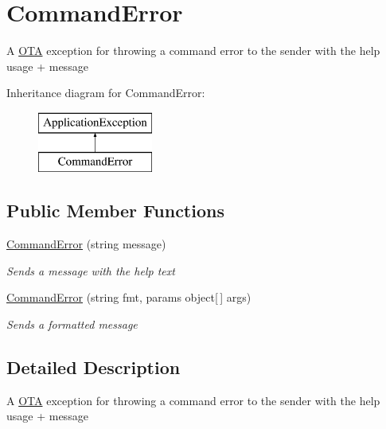 \hypertarget{classOTA_1_1Command_1_1CommandError}{}\section{Command\+Error}
\label{classOTA_1_1Command_1_1CommandError}


A \hyperlink{namespaceOTA}{O\+T\+A} exception for throwing a command error to the sender with the help usage + message  


Inheritance diagram for Command\+Error\+:\begin{figure}[H]
\begin{center}
\leavevmode
\includegraphics[height=2.000000cm]{classOTA_1_1Command_1_1CommandError}
\end{center}
\end{figure}
\subsection*{Public Member Functions}
\begin{DoxyCompactItemize}
\item 
\hyperlink{classOTA_1_1Command_1_1CommandError_a8037ed3919e1421eabe24217da22f59d}{Command\+Error} (string message)
\begin{DoxyCompactList}\small\item\em Sends a message with the help text \end{DoxyCompactList}\item 
\hyperlink{classOTA_1_1Command_1_1CommandError_a63dffa23aa9ff9c8063f8dc194d88870}{Command\+Error} (string fmt, params object\mbox{[}$\,$\mbox{]} args)
\begin{DoxyCompactList}\small\item\em Sends a formatted message \end{DoxyCompactList}\end{DoxyCompactItemize}


\subsection{Detailed Description}
A \hyperlink{namespaceOTA}{O\+T\+A} exception for throwing a command error to the sender with the help usage + message 



